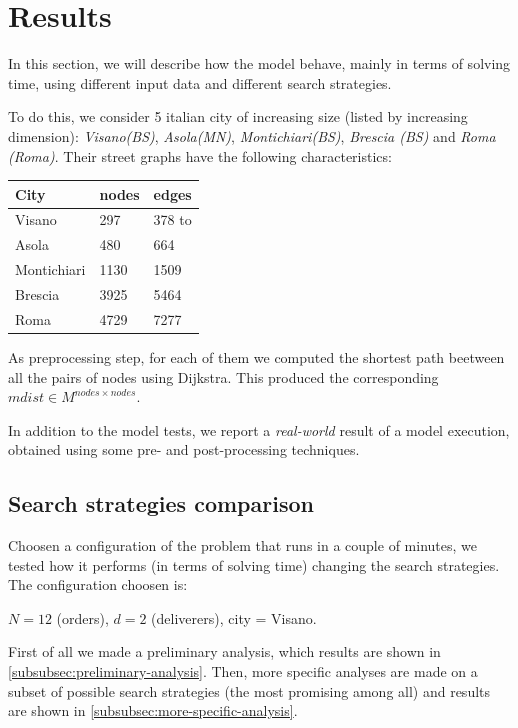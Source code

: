 \documentclass[10pt]{article}
\begin{document}
	\section{Results}
	\label{Results}

	In this section, we will describe how the model behave, mainly in terms of solving
	time, using different input data and different search strategies.

	To do this, we consider 5 italian city of increasing size (listed by increasing dimension): 
	\textit{Visano(BS)}, \textit{Asola(MN)}, \textit{Montichiari(BS)}, \textit{Brescia (BS)} and \textit{Roma (Roma)}.
	Their street graphs have the following characteristics:%
	\begin{table}[h]
		\centering
		\begin{tabular}{l|ll}
			City & nodes & edges \\
			\hline
			Visano & 297 & 378 to\\
			Asola & 480 & 664 \\
			Montichiari & 1130 & 1509 \\
			Brescia & 3925 & 5464 \\
			Roma & 4729 & 7277 \\
		\end{tabular}		
	\end{table}
	
	As preprocessing step, for each of them we computed the shortest path beetween all the pairs
	of nodes using Dijkstra. This produced the corresponding $mdist \in M^{nodes \times nodes}$.

	In addition to the model tests, we report a \textit{real-world} result of a model execution, obtained using some pre- and post-processing techniques.  

	\subsection{Search strategies comparison}
	\label{subsec:test-strategies}
	Choosen a configuration of the problem that runs in a couple of minutes,
	we tested how it performs (in terms of solving time) changing the search strategies.
	The configuration choosen is:
	\begin{center}
		$N = 12$ (orders), $d = 2$ (deliverers), city = Visano.		
	\end{center}

	First of all we made a preliminary analysis, which results are shown in
	\cref{subsubsec:preliminary-analysis}. Then, more specific analyses
	are made on a subset of possible search strategies (the most promising among all)
	and results are shown in \cref{subsubsec:more-specific-analysis}.
\end{document}
